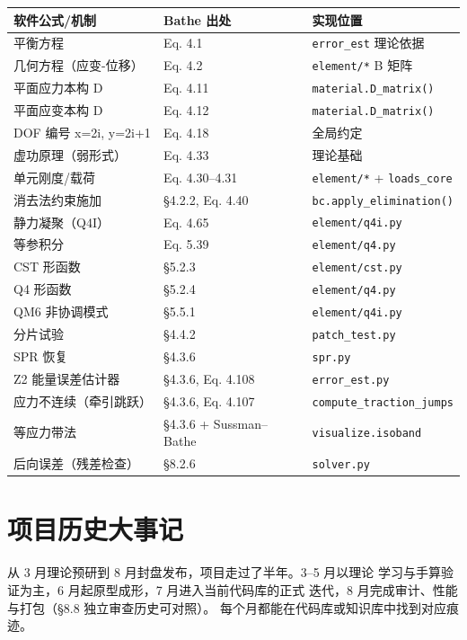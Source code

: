 \documentclass[12pt,a4paper]{ctexart}
\newcommand{\fem}{\Verb}
\begin{document}
\begin{longtable}{p{4.7cm}p{3.7cm}p{6.2cm}}
\toprule
\textbf{软件公式/机制} & \textbf{Bathe 出处} & \textbf{实现位置} \\
\midrule
平衡方程 & Eq. 4.1 & \fem|error_est| 理论依据 \\
几何方程（应变-位移） & Eq. 4.2 & \fem|element/*| B 矩阵 \\
平面应力本构 D & Eq. 4.11 & \fem|material.D_matrix()| \\
平面应变本构 D & Eq. 4.12 & \fem|material.D_matrix()| \\
DOF 编号 x=2i, y=2i+1 & Eq. 4.18 & 全局约定 \\
虚功原理（弱形式） & Eq. 4.33 & 理论基础 \\
单元刚度/载荷 & Eq. 4.30--4.31 & \fem|element/*| + \fem|loads_core| \\
消去法约束施加 & §4.2.2, Eq. 4.40 & \fem|bc.apply_elimination()| \\
静力凝聚（Q4I） & Eq. 4.65 & \fem|element/q4i.py| \\
等参积分 & Eq. 5.39 & \fem|element/q4.py| \\
CST 形函数 & §5.2.3 & \fem|element/cst.py| \\
Q4 形函数 & §5.2.4 & \fem|element/q4.py| \\
QM6 非协调模式 & §5.5.1 & \fem|element/q4i.py| \\
分片试验 & §4.4.2 & \fem|patch_test.py| \\
SPR 恢复 & §4.3.6 & \fem|spr.py| \\
Z2 能量误差估计器 & §4.3.6, Eq. 4.108 & \fem|error_est.py| \\
应力不连续（牵引跳跃） & §4.3.6, Eq. 4.107 & \fem|compute_traction_jumps| \\
等应力带法 & §4.3.6 + Sussman--Bathe & \fem|visualize.isoband| \\
后向误差（残差检查） & §8.2.6 & \fem|solver.py| \\
\bottomrule
\end{longtable}

\section{项目历史大事记}

从 3 月理论预研到 8 月封盘发布，项目走过了半年。3--5 月以理论
学习与手算验证为主，6 月起原型成形，7 月进入当前代码库的正式
迭代，8 月完成审计、性能与打包（§8.8 独立审查历史可对照）。
每个月都能在代码库或知识库中找到对应痕迹。
\end{document}
